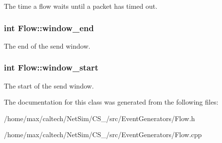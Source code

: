 \-The time a flow waits until a packet has timed out. 

\hypertarget{classFlow_afdc42d6ad08298dd64a8b85e933dbac6}{
\subsubsection[{window\-\_\-end}]{\setlength{\rightskip}{0pt plus 5cm}int {\bf \-Flow\-::window\-\_\-end}}}\label{classFlow_afdc42d6ad08298dd64a8b85e933dbac6}


\-The end of the send window. 

\hypertarget{classFlow_a0ef05b40ea27e2fecabb44d20219a40a}{
\subsubsection[{window\-\_\-start}]{\setlength{\rightskip}{0pt plus 5cm}int {\bf \-Flow\-::window\-\_\-start}}}\label{classFlow_a0ef05b40ea27e2fecabb44d20219a40a}


\-The start of the send window. 



\-The documentation for this class was generated from the following files\-:\begin{DoxyCompactItemize}
\item 
/home/max/caltech/\-Net\-Sim/\-C\-S\-\_/src/\-Event\-Generators/\-Flow.\-h\item 
/home/max/caltech/\-Net\-Sim/\-C\-S\-\_/src/\-Event\-Generators/\-Flow.\-cpp\end{DoxyCompactItemize}
